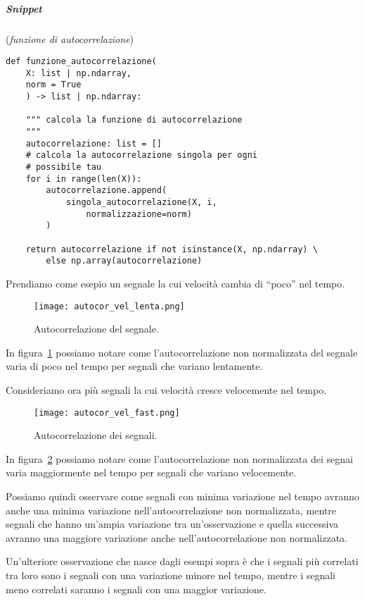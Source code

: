 \subparagraph*{Snippet} (\textit{funzione di autocorrelazione})
\begin{verbatim}
def funzione_autocorrelazione(
    X: list | np.ndarray,
    norm = True
    ) -> list | np.ndarray:
    
    """ calcola la funzione di autocorrelazione
    """
    autocorrelazione: list = []
    # calcola la autocorrelazione singola per ogni
    # possibile tau
    for i in range(len(X)):
        autocorrelazione.append(
            singola_autocorrelazione(X, i, 
                normalizzazione=norm)
        )

    return autocorrelazione if not isinstance(X, np.ndarray) \
        else np.array(autocorrelazione)
\end{verbatim}

\begin{esempio}[Autocorrelazione]
    Prendiamo come esepio un segnale la cui velocità cambia di ``poco''
    nel tempo.

    \begin{figure}[H]
        \centering
        \texttt{[image: autocor\_vel\_lenta.png]}
        \caption{Autocorrelazione del segnale.}
        \label{fig:autcor_slow}
    \end{figure}

    In figura~\ref{fig:autcor_slow} possiamo notare come l'autocorrelazione non normalizzata
    del segnale varia di poco nel tempo per segnali che variano lentamente.

    Consideriamo ora più segnali la cui velocità cresce velocemente nel tempo.

    \begin{figure}[H]
        \centering
        \texttt{[image: autocor\_vel\_fast.png]}
        \caption{Autocorrelazione dei segnali.}
        \label{fig:autcor_fast}
    \end{figure}

    In figura~\ref{fig:autcor_fast} possiamo notare come l'autocorrelazione non normalizzata
    dei segnai varia maggiormente nel tempo per segnali che variano velocemente.

    Possiamo quindi osservare come segnali con minima variazione nel tempo avranno anche
    una minima variazione nell'autocorrelazione non normalizzata, mentre segnali che hanno
    un'ampia variazione tra un'osservazione e quella successiva avranno una maggiore variazione 
    anche nell'autocorrelazione non normalizzata.

    Un'ulteriore osservazione che nasce dagli esempi sopra è che i segnali più 
    correlati tra loro sono i segnali con una variazione minore nel tempo, mentre
    i segnali meno correlati saranno i segnali con una maggior variazione. 

\end{esempio}


